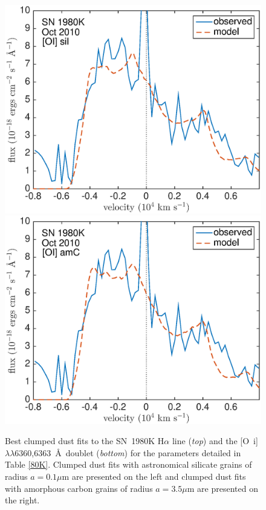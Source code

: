 {\begin{figure}[!t]
\includegraphics[scale=0.4,clip=true, trim=20 0 40 20]{chapters/chapter6/figs/80K/clumped/OI}
\includegraphics[scale=0.4,clip=true, trim=20 0 40 20]{chapters/chapter6/figs/80K/clumped/OI_amC}
\caption{Best clumped dust fits to the SN~1980K H$\alpha$ line ({\em top}) and the [O~{\sc i}]$\lambda\lambda$6360,6363~\AA\ doublet ({\em bottom}) for the parameters detailed in Table \ref{80K}.  Clumped dust fits with astronomical silicate grains of radius $a=0.1 \mu$m are presented on the left and clumped dust fits with amorphous carbon grains of radius $a=3.5 \mu$m are presented on the right.}
\label{80K_clumped}
\end{figure}
}


